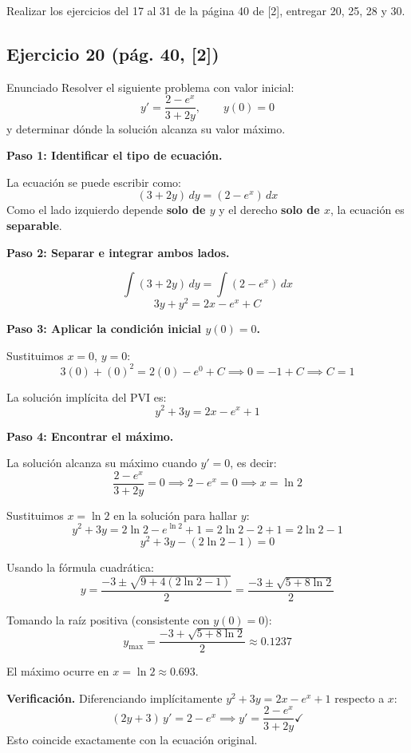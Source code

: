 \newpage


 Realizar los ejercicios del 17 al 31 de la página 40 de [2], entregar
20, 25, 28 y 30.
\subsection*{Ejercicio 20 \quad\normalfont\small(pág. 40, [2])}
\begin{enunciado}{Enunciado}
    Resolver el siguiente problema con valor inicial:
    \[
        y' = \frac{2 - e^x}{3 + 2y}, \qquad y(0) = 0
    \]
    y determinar dónde la solución alcanza su valor máximo.
\end{enunciado}

\begin{respuesta}

\textbf{Paso 1: Identificar el tipo de ecuación.}

La ecuación se puede escribir como:
\[
    (3 + 2y)\,dy = (2 - e^x)\,dx
\]
Como el lado izquierdo depende \textbf{solo de $y$} y el derecho 
\textbf{solo de $x$}, la ecuación es \textbf{separable}.

\medskip
\textbf{Paso 2: Separar e integrar ambos lados.}

\[
    \int (3 + 2y)\,dy = \int (2 - e^x)\,dx
\]
\[
    3y + y^2 = 2x - e^x + C
\]

\medskip
\textbf{Paso 3: Aplicar la condición inicial $y(0) = 0$.}

Sustituimos $x = 0$, $y = 0$:
\[
    3(0) + (0)^2 = 2(0) - e^0 + C \implies 0 = -1 + C \implies C = 1
\]

La solución implícita del PVI es:
\[
    \boxed{y^2 + 3y = 2x - e^x + 1}
\]

\medskip
\textbf{Paso 4: Encontrar el máximo.}

La solución alcanza su máximo cuando $y' = 0$, es decir:
\[
    \frac{2 - e^x}{3 + 2y} = 0 \implies 2 - e^x = 0 \implies x = \ln 2
\]

Sustituimos $x = \ln 2$ en la solución para hallar $y$:
\[
    y^2 + 3y = 2\ln 2 - e^{\ln 2} + 1 = 2\ln 2 - 2 + 1 = 2\ln 2 - 1
\]
\[
    y^2 + 3y - (2\ln 2 - 1) = 0
\]

Usando la fórmula cuadrática:
\[
    y = \frac{-3 \pm \sqrt{9 + 4(2\ln 2 - 1)}}{2} 
    = \frac{-3 \pm \sqrt{5 + 8\ln 2}}{2}
\]

Tomando la raíz positiva (consistente con $y(0) = 0$):
\[
    y_{\max} = \frac{-3 + \sqrt{5 + 8\ln 2}}{2} \approx 0.1237
\]

El máximo ocurre en $x = \ln 2 \approx 0.693$.

\medskip
\textbf{Verificación.} Diferenciando implícitamente $y^2 + 3y = 2x - e^x + 1$
respecto a $x$:
\[
    (2y + 3)\,y' = 2 - e^x \implies y' = \frac{2 - e^x}{3 + 2y} \checkmark
\]
Esto coincide exactamente con la ecuación original.

\end{respuesta}

